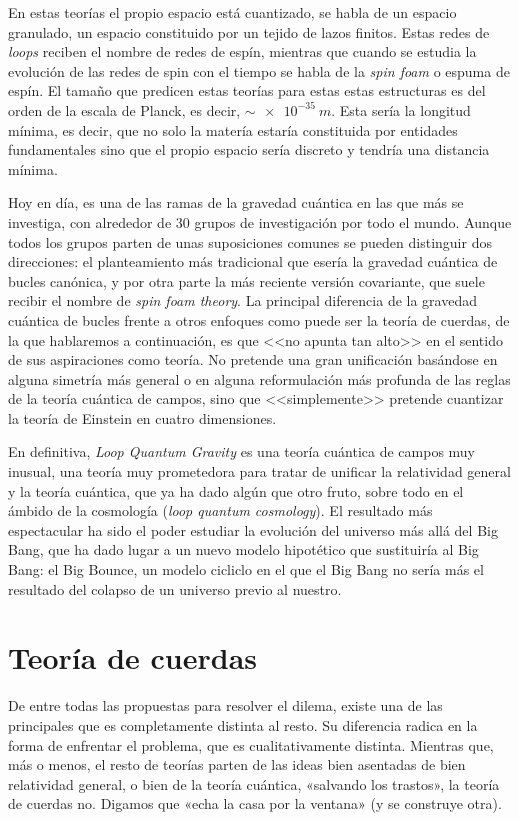 \documentclass[11pt,a4paper,titlepage]{article}
\begin{document}
En estas teorías el propio espacio está cuantizado, se habla de un espacio granulado, un espacio constituido por  un tejido de lazos finitos. Estas redes de \emph{loops} reciben el nombre de redes de espín, mientras que cuando se estudia la evolución de las redes de spin con el tiempo se habla de la \emph{spin foam} o espuma de espín. El tamaño que predicen estas teorías para estas estas estructuras es del orden de la escala de Planck, es decir, $\sim\SI{e-35}{m}$. Esta sería la longitud mínima, es decir, que no solo la matería estaría constituida por entidades fundamentales sino que el propio espacio sería discreto y tendría una distancia mínima.

Hoy en día, es una de las ramas de la gravedad cuántica en las que más se investiga, con alrededor de 30 grupos de investigación por todo el mundo. Aunque todos los grupos parten de unas suposiciones comunes se pueden distinguir dos direcciones: el planteamiento más tradicional que esería la gravedad cuántica de bucles canónica, y por otra parte la más reciente versión covariante, que suele recibir el nombre de \emph{spin foam theory}. La principal diferencia de la gravedad cuántica de bucles frente a otros enfoques como puede ser la teoría de cuerdas, de la que hablaremos a continuación, es que <<no apunta tan alto>> en el sentido de sus aspiraciones como teoría. No pretende una gran unificación basándose en alguna simetría más general o en alguna reformulación más profunda de las reglas de la teoría cuántica de campos, sino que <<simplemente>> pretende cuantizar la teoría de Einstein en cuatro dimensiones.

En definitiva, \textit{Loop Quantum Gravity} es una teoría cuántica de campos muy inusual, una teoría muy prometedora para tratar de unificar la relatividad general y la teoría cuántica, que ya ha dado algún que otro fruto, sobre todo en el ámbido de la cosmología (\emph{loop quantum cosmology}). El resultado más espectacular ha sido el poder estudiar la evolución del universo más allá del Big Bang, que ha dado lugar a un nuevo modelo hipotético que sustituiría al Big Bang: el Big Bounce, un modelo cicliclo en el que el Big Bang no sería más el resultado del colapso de un universo previo al nuestro.

%
%
%
%
\newpage
\section{Teoría de cuerdas}

De entre todas las propuestas para resolver el dilema, existe una de las principales que es completamente distinta al resto. Su diferencia radica en la forma de enfrentar el problema, que es cualitativamente distinta. Mientras que, más o menos, el resto de teorías parten de las ideas bien asentadas de bien relatividad general, o bien de la teoría cuántica, «salvando los trastos», la teoría de cuerdas no. Digamos que «echa la casa por la ventana» (y se construye otra).
\end{document}
